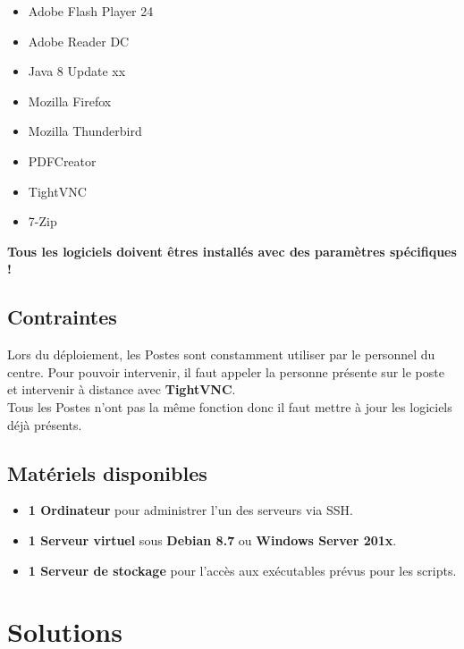 \documentclass[11pt,a4paper,oneside]{article}
\begin{document}
\begin{itemize}
	\item Adobe Flash Player 24
	\item Adobe Reader DC
	\item Java 8 Update xx
	\item Mozilla Firefox
	\item Mozilla Thunderbird
	\item PDFCreator
	\item TightVNC
	\item 7-Zip
\end{itemize}

\begin{center}
\textbf{Tous les logiciels doivent êtres installés avec des paramètres spécifiques !}
\end{center}
\subsection{Contraintes}
Lors du déploiement, les Postes sont constamment utiliser par le personnel du centre. Pour pouvoir intervenir, il faut appeler la personne présente sur le poste et intervenir à distance avec \textbf{TightVNC}.\\

Tous les Postes n'ont pas la même fonction donc il faut mettre à jour les logiciels déjà présents.

\subsection{Matériels disponibles}
\begin{itemize}
	\item \textbf{1 Ordinateur} pour administrer l'un des serveurs via SSH.
	\item \textbf{1 Serveur virtuel} sous \textbf{Debian 8.7} ou \textbf{Windows Server 201x}.
	\item \textbf{1 Serveur de stockage} pour l'accès aux exécutables prévus pour les scripts. 
\end{itemize}
\newpage

\section{Solutions}
\end{document}
